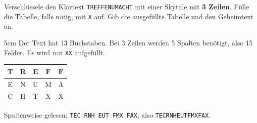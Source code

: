 \question[3]
Verschlüssele den Klartext \texttt{TREFFENUMACHT} mit einer Skytale mit \textbf{3 Zeilen}.
Fülle die Tabelle, falls nötig, mit \texttt{X} auf.
Gib die ausgefüllte Tabelle und den Geheimtext an.

\begin{solutionbox}{5cm}
Der Text hat 13 Buchstaben. Bei 3 Zeilen werden 5 Spalten benötigt, also 15 Felder.
Es wird mit \texttt{XX} aufgefüllt.

\begin{center}
\begin{tabular}{|c|c|c|c|c|}
\hline
T & R & E & F & F \\
\hline
E & N & U & M & A \\
\hline
C & H & T & X & X \\
\hline
\end{tabular}
\end{center}

Spaltenweise gelesen: \texttt{TEC RNH EUT FMX FAX}, also \texttt{TECRNHEUTFMXFAX}.
\end{solutionbox}
